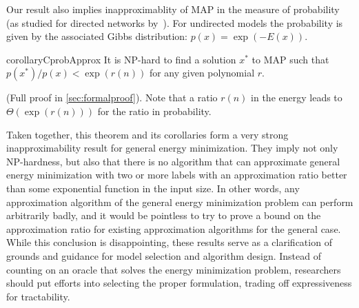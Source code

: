  Our result also implies inapproximablity of MAP in the measure of probability (as studied for directed networks by~\citet{Kwisthout-13}). For undirected models the probability is given by the associated Gibbs distribution: $p(x) = \exp(-E(x))$.
 \begin{restatable}{corollary}{CprobApprox}\label{C:prob-approx}
 It is NP-hard to find a solution $x^*$ to MAP such that $p(x^*)/p(x) < \exp(r(n))$ for any given polynomial $r$.
 \end{restatable}
 \begin{proofsketch}
 (Full proof in \cref{sec:formalproof}). Note that a ratio $r(n)$ in the energy leads to $\Theta(\exp(r(n)))$ for the ratio in probability.
 \end{proofsketch}

Taken together, this theorem and its corollaries form a very strong inapproximability result for general energy minimization. They imply not only NP-hardness, but also that there is no algorithm that can approximate general energy minimization with two or more labels with an approximation ratio better than {\red some exponential function in the input size}. In other words, any approximation algorithm of the general energy minimization problem can perform arbitrarily badly, and it would be pointless to try to prove a bound on the approximation ratio for existing approximation algorithms for the general case.  While this conclusion is disappointing, these results serve as a clarification of grounds and guidance for model selection and algorithm design. Instead of counting on an oracle that solves the energy minimization problem, researchers should put efforts into selecting the proper formulation, trading off expressiveness for tractability. %

